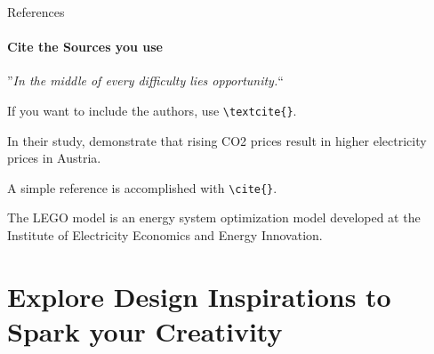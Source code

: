 \documentclass[aspectratio=169]{beamer}
\begin{document}
\begin{frame}
\end{frame}


\begin{frame}{References}
    \framesubtitle{Cite the Sources you use}

  \begin{coloredblock}[grey]
    \centering
      ”\textit{In the middle of every difficulty lies opportunity.}“
      
      \vspace{0.7cm}
      \scriptsize \textcite{Einstein2018}
  \end{coloredblock}

  \begin{coloredblock}
      If you want to include the authors, use \texttt{\textbackslash textcite\{\}}.

      \vspace{0.5cm}
      In their study, \textbf{\textcite{gaugl2023}} demonstrate that rising CO2 prices result in higher electricity prices in Austria.
  \end{coloredblock}

  \begin{coloredblock}
      A simple reference is accomplished with \texttt{\textbackslash cite\{\}}.

      \vspace{0.5cm}
      The LEGO model is an energy system optimization model developed at the Institute of Electricity Economics and Energy Innovation. \textbf{\cite{wogrin2022}}
  \end{coloredblock}

\end{frame}


\section{Explore \textbf{Design Inspirations} to Spark  your Creativity}

\end{document}

